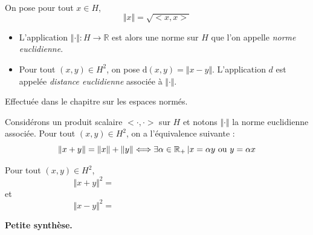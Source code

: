 \documentclass[a4paper,10pt]{report}
\begin{document}
\newpage

$\phantom{test}$

\vspace{9cm}

\begin{defip} On pose pour tout $x \in H$,
$$ \Vert x \Vert = \sqrt{<x,x>}$$
\begin{itemize}
\item L'application $\Vert \cdot \Vert : H \rightarrow \mathbb{R}$ est alors une norme sur $H$ que l'on appelle \textit{norme euclidienne}.
\item Pour tout $(x,y) \in H^2$, on pose $\textrm{d}(x,y) = \Vert x-y \Vert$. L'application $d$ est appelée \textit{distance euclidienne} associée à $\Vert \cdot \Vert$.
\end{itemize}
\end{defip} 

\begin{preuve} Effectuée dans le chapitre sur les espaces normés.
%
\end{preuve}

\begin{thm}
Considérons un produit scalaire $< \cdot , \cdot>$ sur $H$ et notons $\Vert \cdot \Vert$ la norme euclidienne associée. Pour tout $(x,y) \in H^2$, on a l'équivalence suivante :
$$ \Vert x+y \Vert = \Vert x \Vert + \Vert y \Vert \Longleftrightarrow \exists \alpha \in \mathbb{R}_{+} \, \vert x= \alpha y \hbox{ ou } y = \alpha x $$
\end{thm}

\begin{preuve} 

\vspace{8.5cm}
\end{preuve}

\newpage

\phantom{test}

\vspace{5cm}

\begin{rem} Pour tout $(x,y) \in H^2$,
$$ \Vert x+y \Vert^2 = \phantom{testetstststtestetststststststststst}$$
et
$$ \Vert x-y \Vert^2 =  \phantom{testetstststtestetststststststststst}$$
\end{rem}

\bigskip

\begin{center}
\textbf{Petite synthèse.}
\end{center}
\end{document}
